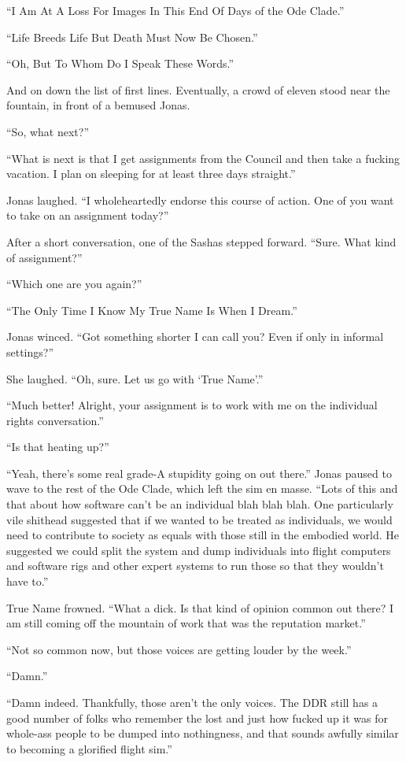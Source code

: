 ``I Am At A Loss For Images In This End Of Days of the Ode Clade.''

``Life Breeds Life But Death Must Now Be Chosen.''

``Oh, But To Whom Do I Speak These Words.''

And on down the list of first lines. Eventually, a crowd of eleven stood near the fountain, in front of a bemused Jonas.

``So, what next?''

``What is next is that I get assignments from the Council and then take a fucking vacation. I plan on sleeping for at least three days straight.''

Jonas laughed. ``I wholeheartedly endorse this course of action. One of you want to take on an assignment today?''

After a short conversation, one of the Sashas stepped forward. ``Sure. What kind of assignment?''

``Which one are you again?''

``The Only Time I Know My True Name Is When I Dream.''

Jonas winced. ``Got something shorter I can call you? Even if only in informal settings?''

She laughed. ``Oh, sure. Let us go with `True Name'.''

``Much better! Alright, your assignment is to work with me on the individual rights conversation.''

``Is that heating up?''

``Yeah, there's some real grade-A stupidity going on out there.'' Jonas paused to wave to the rest of the Ode Clade, which left the sim en masse. ``Lots of this and that about how software can't be an individual blah blah blah. One particularly vile shithead suggested that if we wanted to be treated as individuals, we would need to contribute to society as equals with those still in the embodied world. He suggested we could split the system and dump individuals into flight computers and software rigs and other expert systems to run those so that they wouldn't have to.''

True Name frowned. ``What a dick. Is that kind of opinion common out there? I am still coming off the mountain of work that was the reputation market.''

``Not so common now, but those voices are getting louder by the week.''

``Damn.''

``Damn indeed. Thankfully, those aren't the only voices. The DDR still has a good number of folks who remember the lost and just how fucked up it was for whole-ass people to be dumped into nothingness, and that sounds awfully similar to becoming a glorified flight sim.''

